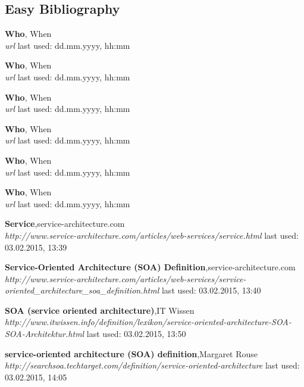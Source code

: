 \documentclass[10pt]{article}
\begin{document}
\subsection{Easy Bibliography}
\begin{thebibliography}{56}

   \textbf{Who}, When\\
  \textit{url}
  \newline last used: dd.mm.yyyy, hh:mm


   \textbf{Who}, When\\
  \textit{url}
  \newline last used: dd.mm.yyyy, hh:mm
 
 
   \textbf{Who}, When\\
  \textit{url}
  \newline last used: dd.mm.yyyy, hh:mm
 
 
   \textbf{Who}, When\\
  \textit{url}
  \newline last used: dd.mm.yyyy, hh:mm
 
 
 
   \textbf{Who}, When\\
  \textit{url}
  \newline last used: dd.mm.yyyy, hh:mm
  
 
   \textbf{Who}, When\\
  \textit{url}
  \newline last used: dd.mm.yyyy, hh:mm
    
  
   
 
   \textbf{Service},service-architecture.com \\
  \textit{http://www.service-architecture.com/articles/web-services/service.html}
  \newline last used: 03.02.2015, 13:39
     
     
   \textbf{Service-Oriented Architecture (SOA) Definition},service-architecture.com \\
  \textit{http://www.service-architecture.com/articles/web-services/service-oriented\_architecture\_soa\_definition.html}
  \newline last used: 03.02.2015, 13:40
     
     
   \textbf{SOA (service oriented architecture)},IT Wissen \\
  \textit{http://www.itwissen.info/definition/lexikon/service-oriented-architecture-SOA-SOA-Architektur.html}
  \newline last used: 03.02.2015, 13:50
     
   \textbf{service-oriented architecture (SOA) definition},Margaret Rouse \\
  \textit{http://searchsoa.techtarget.com/definition/service-oriented-architecture}
  \newline last used: 03.02.2015, 14:05



 
\end{thebibliography}
\end{document}
